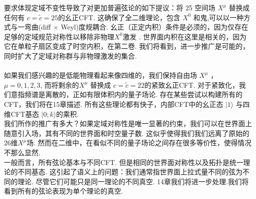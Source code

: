 要求体现定域不变性导致了对更加普遍弦论的如下提议：将 25 空间场 $X^{\mu}$ 替换成任何有 $c=\tilde{c}=25$的幺正CFT. 这确保了全二维理论，包含 $X^{0}$ 和鬼,可以以一种方式与一弯曲(diff $\times$ Weyl)度规耦合. 幺正（正定内积）条件是必须的，因为仅存在足够的定域规范对称性以移除非物理$X^{0}$激发 . 世界面内积在这里是相关的，因为它在单粒子扇区变成了时空内积，在第二卷. 我们将看到，进一步推广是可能的， 同时扩大了定域对称群与非物理激发的集合.   \\                                                   \\
如果我们感兴趣的是低能物理看起来像四维的，我们保持自由场 $X^{\mu}$ ， $\mu=0,1,2,3$, 而将剩余的$X^{\mu}$ 替换成 $c=\tilde{c}=22$的紧致幺正CFT. 对于紧致化，我们意指频谱是离散的，正如有限体积内的量子场论. 存在某些尝试以构建所有的CFT，我们将在15章描述. 
所有这些理论都有快子，内部CFT中的幺正态 $|1\rangle$ 与四维CFT基态 $|0 ; k\rangle$的乘积.\\
我们所作的推广有多大？如果定域对称性是唯一显著的约束，我们可以在世界面上随意引入场，其有不同的世界面和时空量子数. 这似乎使得我们我们远离了原始的26维$X^\mu$场. 然而在二维中，在看似不同的量子场论之间存在很多等价性，使得情况不那么显然. \\
一般而言，所有弦论基本与不同CFT. 但是相同的世界面对称性以及拓扑是统一理论的不同基态. 这引起了语义上的问题：我们通常指世界面上拉式量不同的弦为不同的理论. 尽管它们可能只是同一理论的不同真空. 14章我们将进一步处理.我们将看到所有的弦论表现为单个理论的真空.
